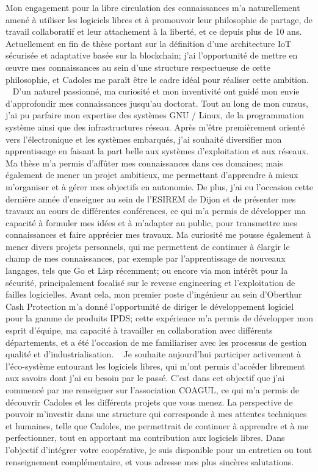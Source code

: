 \documentclass[11pt, a4paper]{awesome-cv}
\begin{document}
\begin{cvletter}
  Mon engagement pour la libre circulation des connaissances m'a naturellement amené à utiliser les logiciels libres et à promouvoir leur philosophie de partage, de travail collaboratif et leur attachement à la liberté, et ce depuis plus de 10 ans. Actuellement en fin de thèse portant sur la définition d'une architecture IoT sécurisée et adaptative basée sur la blockchain; j'ai l'opportunité de mettre en \oe{}uvre mes connaissances au sein d'une structure respectueuse de cette philosophie, et Cadoles me paraît être le cadre idéal pour réaliser cette ambition.
~\vspace{-0.4cm}
D'un naturel passionné, ma curiosité et mon inventivité ont guidé mon envie d'approfondir mes connaissances jusqu'au doctorat. Tout au long de mon cursus, j'ai pu parfaire mon expertise des systèmes GNU / Linux, de la programmation système ainsi que des infrastructures réseau. Après m'être premièrement orienté vers l'électronique et les systèmes embarqués, j'ai souhaité diversifier mon apprentissage en faisant la part belle aux systèmes d'exploitation et aux réseaux. Ma thèse m'a permis d'affûter mes connaissances dans ces domaines; mais également de mener un projet ambitieux, me permettant d'apprendre à mieux m'organiser et à gérer mes objectifs en autonomie. De plus, j'ai eu l'occasion cette dernière année d'enseigner au sein de l'ESIREM de Dijon et de présenter mes travaux au cours de différentes conférences, ce qui m'a permis de développer ma capacité à formuler mes idées et à m'adapter au public, pour transmettre mes connaissances et faire apprécier mes travaux. Ma curiosité me pousse également à mener divers projets personnels, qui me permettent de continuer à élargir le champ de mes connaissances, par exemple par l'apprentissage de nouveaux langages, tels que Go et Lisp récemment; ou encore via mon intérêt pour la sécurité, principalement focalisé sur le reverse engineering et l'exploitation de failles logicielles. Avant cela, mon premier poste d'ingénieur au sein d'Oberthur Cash Protection m'a donné l'opportunité de diriger le développement logiciel pour la gamme de produits IPDS; cette expérience m'a permis de développer mon esprit d'équipe, ma capacité à travailler en collaboration avec différents départements, et a été l'occasion de me familiariser avec les processus de gestion qualité et d'industrialisation.
~\vspace{-0.4cm}
Je souhaite aujourd'hui participer activement à l'éco-système entourant les logiciels libres, qui m'ont permis d'accéder librement aux savoirs dont j'ai eu besoin par le passé. C'est dans cet objectif que j'ai commencé par me renseigner sur l'association COAGUL, ce qui m'a permis de découvrir Cadoles et les différents projets que vous menez. La perspective de pouvoir m'investir dans une structure qui corresponde à mes attentes techniques et humaines, telle que Cadoles, me permettrait de continuer à apprendre et à me perfectionner, tout en apportant ma contribution aux logiciels libres. Dans l'objectif d'intégrer votre coopérative, je suis disponible pour un entretien ou tout renseignement complémentaire, et vous adresse mes plus sincères salutations.
\end{cvletter}
~\vspace{-0.4cm}

\makeletterclosing
\end{document}
